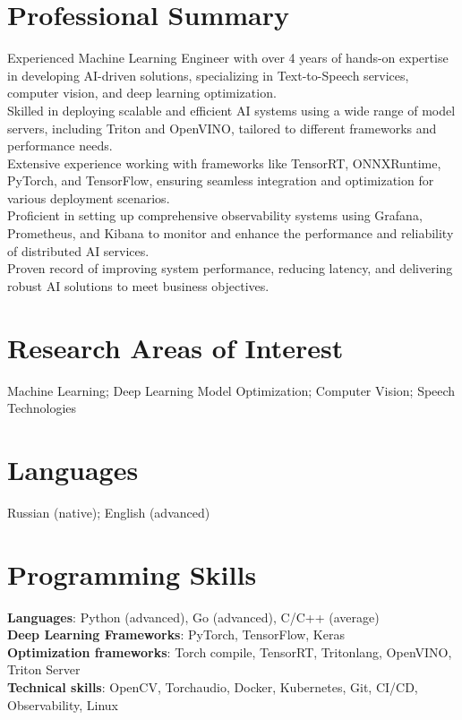 \section{\sc Professional Summary}
Experienced Machine Learning Engineer with over 4 years of hands-on expertise in developing AI-driven solutions, specializing in Text-to-Speech services, computer vision, and deep learning optimization. \\
Skilled in deploying scalable and efficient AI systems using a wide range of model servers, including Triton and OpenVINO, tailored to different frameworks and performance needs. \\
Extensive experience working with frameworks like TensorRT, ONNXRuntime, PyTorch, and TensorFlow, ensuring seamless integration and optimization for various deployment scenarios. \\
Proficient in setting up comprehensive observability systems using Grafana, Prometheus, and Kibana to monitor and enhance the performance and reliability of distributed AI services. \\
Proven record of improving system performance, reducing latency, and delivering robust AI solutions to meet business objectives.

\vspace{3pt}

\section{\sc Research Areas of Interest}
{Machine Learning; Deep Learning Model Optimization; Computer Vision; Speech Technologies}

\vspace{3pt}

\section{\sc Languages}
{Russian (native); English (advanced)}

\section{\sc Programming Skills}
\textbf{Languages}: Python (advanced), Go (advanced), C/C++ (average) \\
\textbf{Deep Learning Frameworks}: PyTorch, TensorFlow, Keras \\
\textbf{Optimization frameworks}: Torch compile, TensorRT, Tritonlang, OpenVINO, Triton Server \\
\textbf{Technical skills}: OpenCV, Torchaudio, Docker, Kubernetes, Git, CI/CD, Observability, Linux

\endinput

